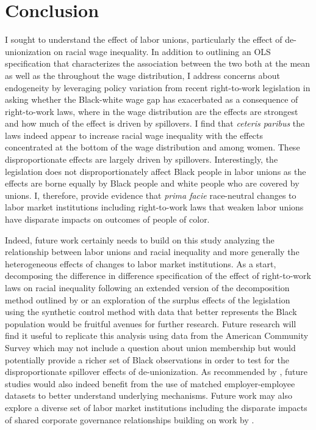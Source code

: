 \documentclass[11pt]{article}
\begin{document}
\section{Conclusion}\label{sec:conc}
I sought to understand the effect of labor unions, particularly the effect of de-unionization on racial wage inequality. In addition to outlining an OLS specification that characterizes the association between the two both at the mean as well as the throughout the wage distribution, I address concerns about endogeneity by leveraging policy variation from recent right-to-work legislation in asking whether the Black-white wage gap has exacerbated as a consequence of right-to-work laws, where in the wage distribution are the effects are strongest and how much of the effect is driven by spillovers. I find that \textit{ceteris paribus} the laws indeed appear to increase racial wage inequality with the effects concentrated at the bottom of the wage distribution and among women. These disproportionate effects are largely driven by spillovers. Interestingly, the legislation does not disproportionately affect Black people in labor unions as the effects are borne equally by Black people and white people who are covered by unions. I, therefore, provide evidence that \textit{prima facie} race-neutral changes to labor market institutions including right-to-work laws that weaken labor unions have disparate impacts on outcomes of people of color.

Indeed, future work certainly needs to build on this study analyzing the relationship between labor unions and racial inequality and more generally the heterogeneous effects of changes to labor market institutions. As a start, decomposing the difference in difference specification of the effect of right-to-work laws on racial inequality following an extended version of the decomposition method outlined by \citet{goodmanbacon2018} or an exploration of the surplus effects of the legislation using the synthetic control method with data that better represents the Black population would be fruitful avenues for further research. Future research will find it useful to replicate this analysis using data from the American Community Survey which may not include a question about union membership but would potentially provide a richer set of Black observations in order to test for the disproportionate spillover effects of de-unionization. As recommended by \citet{fll2021}, future studies would also indeed benefit from the use of matched employer-employee datasets to better understand underlying mechanisms. Future work may also explore a diverse set of labor market institutions including the disparate impacts of shared corporate governance relationships building on work by \citet{jsh2020}.
\end{document}
